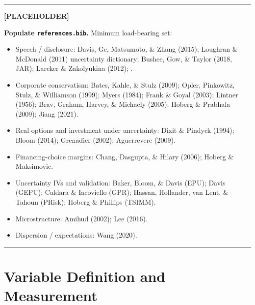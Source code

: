 \documentclass[11pt,a4paper,twocolumn]{article}
\newenvironment{placeholder}{%
  \par\medskip\noindent%
  {\color{placeholderaccent}\rule{\linewidth}{0.4pt}}\par%
  \noindent\textbf{\color{placeholderaccent}[PLACEHOLDER]}\par%
  \smallskip\itshape%
}{%
  \par\upshape\smallskip%
  {\color{placeholderaccent}\rule{\linewidth}{0.4pt}}\par\medskip%
}
\begin{document}
\begin{placeholder}
\textbf{Populate \texttt{references.bib}.} Minimum load-bearing set:
\begin{itemize}
  \item Speech / disclosure: Davis, Ge, Matsumoto, \& Zhang (2015);
        Loughran \& McDonald (2011) uncertainty dictionary;
        Bushee, Gow, \& Taylor (2018, JAR); Larcker \& Zakolyukina
        (2012); \citet{DWZ2021}.
  \item Corporate conservatism: Bates, Kahle, \& Stulz (2009);
        Opler, Pinkowitz, Stulz, \& Williamson (1999); Myers (1984);
        Frank \& Goyal (2003); Lintner (1956); Brav, Graham, Harvey,
        \& Michaely (2005); Hoberg \& Prabhala (2009); Jiang (2021).
  \item Real options and investment under uncertainty: Dixit \&
        Pindyck (1994); Bloom (2014); Grenadier (2002); Aguerrevere
        (2009).
  \item Financing-choice margins: Chang, Dasgupta, \& Hilary (2006);
        Hoberg \& Maksimovic.
  \item Uncertainty IVs and validation: Baker, Bloom, \& Davis (EPU);
        Davis (GEPU); Caldara \& Iacoviello (GPR); Hassan, Hollander,
        van Lent, \& Tahoun (PRisk); Hoberg \& Phillips (TSIMM).
  \item Microstructure: Amihud (2002); Lee (2016).
  \item Dispersion / expectations: Wang (2020).
\end{itemize}
\end{placeholder}

\clearpage

\appendix
\section{Variable Definition and Measurement}
\label{app:vardef}
\end{document}
